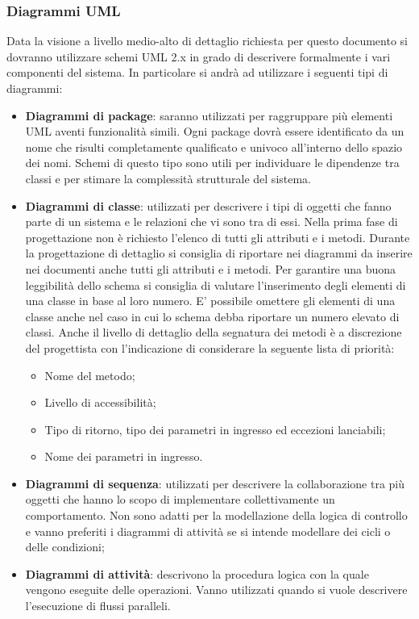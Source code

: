 		\subsubsection{Diagrammi UML}
		Data la visione a livello medio-alto di dettaglio richiesta per questo documento si dovranno utilizzare schemi UML 2.x in grado di descrivere formalmente i vari componenti	del sistema.
		In particolare si andrà ad utilizzare i seguenti tipi di diagrammi:
		\begin{itemize}
		
		
		\item \textbf{Diagrammi di package}: saranno utilizzati per raggruppare più elementi UML aventi funzionalità simili. Ogni package dovrà essere identificato da un	nome che risulti completamente qualificato e univoco all’interno dello spazio
		dei nomi. Schemi di questo tipo sono utili per individuare le dipendenze tra classi e per stimare la complessità strutturale del sistema.
		\item \textbf{Diagrammi di classe}: utilizzati per descrivere i tipi di oggetti che fanno parte di un sistema e le relazioni che vi sono tra di essi. Nella prima fase di progettazione non è richiesto l'elenco di tutti gli attributi e i metodi. Durante
		la progettazione di dettaglio si consiglia di riportare nei diagrammi da inserire nei documenti anche tutti gli attributi e i metodi. Per garantire una buona	leggibilità dello schema si consiglia di valutare l'inserimento degli elementi di una classe in base al loro numero. E' possibile omettere gli elementi di una classe anche nel caso in cui lo schema debba riportare un numero elevato di classi. Anche il livello di dettaglio della segnatura dei metodi è a discrezione	del progettista con l’indicazione di considerare la seguente lista di priorità:
		\begin{itemize}		
		\item Nome del metodo;
		\item Livello di accessibilità;
		\item Tipo di ritorno, tipo dei parametri in ingresso ed eccezioni lanciabili;
		\item Nome dei parametri in ingresso.
		\end{itemize}
		\item \textbf{Diagrammi di sequenza}: utilizzati per descrivere la collaborazione tra più oggetti che hanno lo scopo di implementare collettivamente un comportamento. Non sono adatti per la modellazione della logica di controllo e vanno preferiti i diagrammi di attività se si intende modellare dei cicli o delle condizioni;
		\item \textbf{Diagrammi di attività}: descrivono la procedura logica con la quale vengono eseguite delle operazioni. Vanno utilizzati quando si vuole descrivere	l’esecuzione di flussi paralleli.
        \end{itemize}
